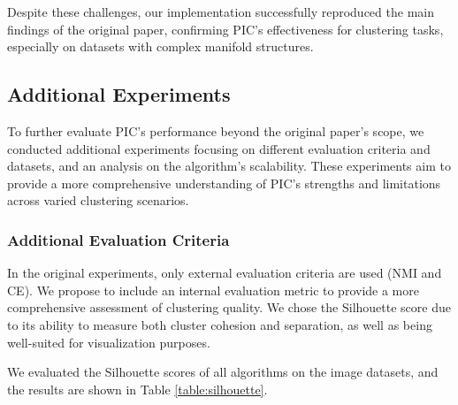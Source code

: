 Despite these challenges, our implementation successfully reproduced the main findings of the original paper, confirming PIC's effectiveness for clustering tasks, especially on datasets with complex manifold structures.

\subsection{Additional Experiments}
To further evaluate PIC's performance beyond the original paper's scope, we conducted additional experiments focusing on different evaluation criteria and datasets, and an analysis on the algorithm's scalability. These experiments aim to provide a more comprehensive understanding of PIC's strengths and limitations across varied clustering scenarios.

\subsubsection{Additional Evaluation Criteria}
In the original experiments, only external evaluation criteria are used (NMI and CE). We propose to include an internal evaluation metric to provide a more comprehensive assessment of clustering quality. We chose the Silhouette score due to its ability to measure both cluster cohesion and separation, as well as being well-suited for visualization purposes.

We evaluated the Silhouette scores of all algorithms on the image datasets, and the results are shown in Table \ref{table:silhouette}.

